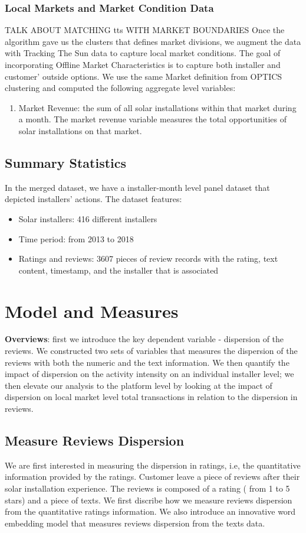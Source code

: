 \documentclass[msom,blindrev]{informs3}
\begin{document}
\subsubsection{Local Markets and Market Condition Data}
TALK ABOUT MATCHING tts WITH MARKET BOUNDARIES 
Once the algorithm gave us the clusters that defines market divisions, we augment the data with Tracking The Sun data to capture local market conditions. The goal of incorporating Offline Market Characteristics is to capture both installer and customer' outside options. We use the same Market definition from OPTICS clustering and computed the following aggregate level variables: 
\begin{enumerate}
	\item Market Revenue: the sum of all solar installations within that market during a month. The market revenue variable measures the total opportunities of solar installations on that market. 
\end{enumerate} 
\subsection{Summary Statistics}
In the merged dataset, we have a installer-month level panel dataset that depicted installers' actions. The dataset features: 
\begin{itemize}
\item Solar installers: 416 different installers
\item Time period: from 2013 to 2018
\item Ratings and reviews: 3607 pieces of review records with the rating, text content, timestamp, and the installer that is associated  
\end{itemize}
\section{Model and Measures}
\textbf{Overviews}: first we introduce the key dependent variable - dispersion of the reviews. We constructed two sets of variables that measures the dispersion of the reviews with both the numeric and the text information. We then quantify the impact of dispersion on the activity intensity on an individual installer level; we then elevate our analysis to the platform level by looking at the impact of dispersion on local market level total transactions in relation to the dispersion in reviews. 

\subsection{Measure Reviews Dispersion}
\label{subsection_measure_dispersion}
We are first interested in measuring the dispersion in ratings, i.e, the quantitative information provided by the ratings. Customer leave a piece of reviews after their solar installation experience. The reviews is composed of a rating ( from 1 to 5 stars) and a piece of texts. We first discribe how we measure reviews dispersion from the quantitative ratings information. We also introduce an innovative word embedding model that measures reviews dispersion from the texts data. 
\end{document}
